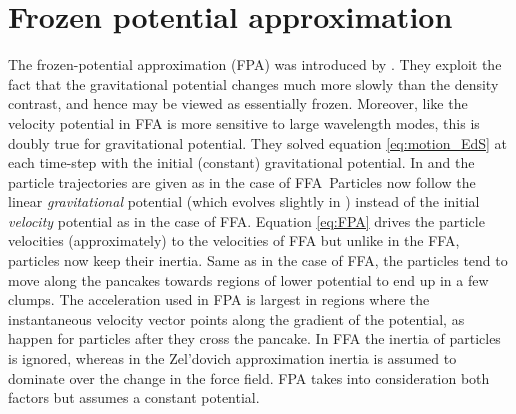 \section{Frozen potential approximation}
The frozen-potential approximation (FPA) was introduced by \textcite{1994MNRAS.266..227B}. They exploit the fact that the gravitational potential changes much more slowly than the density contrast, and hence may be viewed as essentially frozen. Moreover, like the velocity potential in FFA is more sensitive to large wavelength modes, this is doubly true for gravitational potential. They solved equation \eqref{eq:motion_EdS} at each time-step with the initial (constant) gravitational potential. In \LCDM
{}
and the particle trajectories are given as in the case of FFA\,
Particles now follow the linear \textit{gravitational} potential (which evolves slightly in \LCDM) instead of the initial \textit{velocity} potential as in the case of FFA. Equation \eqref{eq:FPA} drives the particle velocities (approximately) to the velocities of FFA but unlike in the FFA, particles now keep their inertia. Same as in the case of FFA, the particles tend to move along the pancakes towards regions of lower potential to end up in a few clumps. The acceleration used in FPA is largest in regions where the instantaneous velocity vector points along the gradient of the potential, as happen for particles after they cross the pancake. In FFA the inertia of particles is ignored, whereas in the Zel'dovich approximation inertia is assumed to dominate over the change in the force field. FPA takes into consideration both factors but assumes a constant potential.

